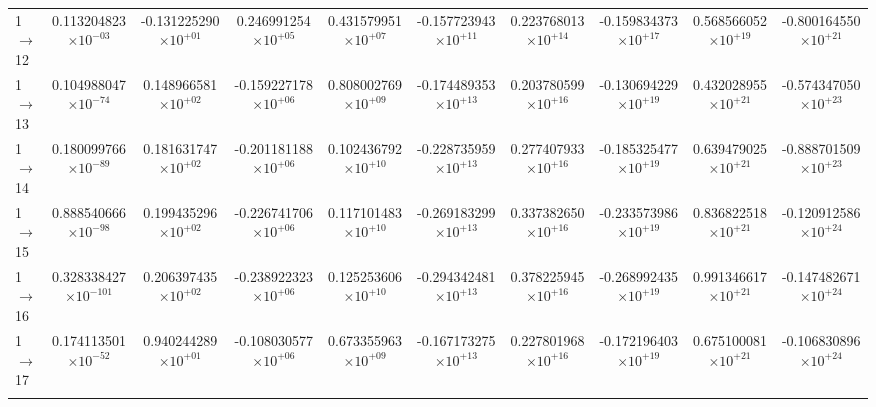 \documentclass[reviewcopy]{elsarticle}
\begin{document}
\begin{landscape}
\begin{longtable}{lccccccccc}
1 $\to$ 12  & 0.113204823$\times10^{-03}$  & -0.131225290$\times10^{+01}$  & 0.246991254$\times10^{+05}$  & 0.431579951$\times10^{+07}$  & -0.157723943$\times10^{+11}$  & 0.223768013$\times10^{+14}$  & -0.159834373$\times10^{+17}$  & 0.568566052$\times10^{+19}$  & -0.800164550$\times10^{+21}$ \\
1 $\to$ 13  & 0.104988047$\times10^{-74}$  & 0.148966581$\times10^{+02}$  & -0.159227178$\times10^{+06}$  & 0.808002769$\times10^{+09}$  & -0.174489353$\times10^{+13}$  & 0.203780599$\times10^{+16}$  & -0.130694229$\times10^{+19}$  & 0.432028955$\times10^{+21}$  & -0.574347050$\times10^{+23}$ \\
1 $\to$ 14  & 0.180099766$\times10^{-89}$  & 0.181631747$\times10^{+02}$  & -0.201181188$\times10^{+06}$  & 0.102436792$\times10^{+10}$  & -0.228735959$\times10^{+13}$  & 0.277407933$\times10^{+16}$  & -0.185325477$\times10^{+19}$  & 0.639479025$\times10^{+21}$  & -0.888701509$\times10^{+23}$ \\
1 $\to$ 15  & 0.888540666$\times10^{-98}$  & 0.199435296$\times10^{+02}$  & -0.226741706$\times10^{+06}$  & 0.117101483$\times10^{+10}$  & -0.269183299$\times10^{+13}$  & 0.337382650$\times10^{+16}$  & -0.233573986$\times10^{+19}$  & 0.836822518$\times10^{+21}$  & -0.120912586$\times10^{+24}$ \\
1 $\to$ 16  & 0.328338427$\times10^{-101}$ & 0.206397435$\times10^{+02}$  & -0.238922323$\times10^{+06}$  & 0.125253606$\times10^{+10}$  & -0.294342481$\times10^{+13}$  & 0.378225945$\times10^{+16}$  & -0.268992435$\times10^{+19}$  & 0.991346617$\times10^{+21}$  & -0.147482671$\times10^{+24}$ \\
1 $\to$ 17  & 0.174113501$\times10^{-52}$  & 0.940244289$\times10^{+01}$  & -0.108030577$\times10^{+06}$  & 0.673355963$\times10^{+09}$  & -0.167173275$\times10^{+13}$  & 0.227801968$\times10^{+16}$  & -0.172196403$\times10^{+19}$  & 0.675100081$\times10^{+21}$  & -0.106830896$\times10^{+24}$ \\[3pt]
\hline \\
\end{longtable}
\normalsize
\renewcommand{\thefootnote}{\arabic{footnote}}
\renewcommand{\arraystretch}{1.0}
\end{landscape}
\end{document}

